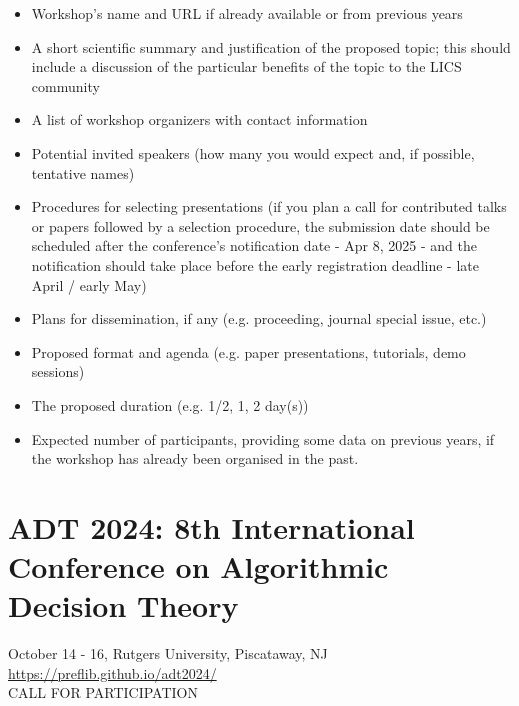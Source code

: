 \documentclass[prodmode,acmtecs]{acmsmall} %
\begin{document}
\begin{itemize}
\begin{itemize}\item  Workshop's name and URL if already available or from previous years
\item  A short scientific summary and justification of the proposed topic; this should include a discussion of the particular benefits of the topic to the LICS community
\item  A list of workshop organizers with contact information
\item  Potential invited speakers (how many you would expect and, if possible, tentative names)
\item  Procedures for selecting presentations (if you plan a call for contributed talks or papers followed by a selection procedure, the submission date should be scheduled after the conference's notification date - Apr 8, 2025 - and the notification should take place before the early registration deadline - late April / early May)
\item  Plans for dissemination, if any (e.g. proceeding, journal special issue, etc.)
\item  Proposed format and agenda (e.g. paper presentations, tutorials, demo sessions)
\item  The proposed duration (e.g. 1/2, 1, 2 day(s))
\item  Expected number of participants, providing some data on previous years, if the workshop has already been organised in the past.
\end{itemize} 
\end{itemize}\section{ADT 2024: 8th International Conference on Algorithmic Decision Theory}\label{ADT2024}  October 14 - 16, Rutgers University, Piscataway, NJ\\ 
  \href{https://preflib.github.io/adt2024/}{https://preflib.github.io/adt2024/}\\ 
CALL FOR PARTICIPATION 
\end{document}
